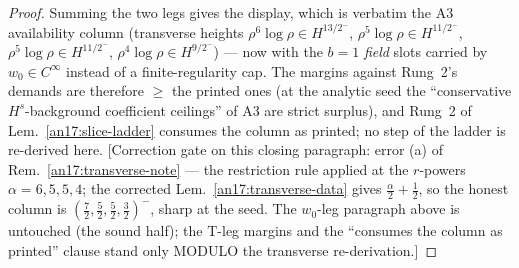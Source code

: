 \begin{proof}
Summing the two legs gives the display, which is verbatim the A3
availability column (transverse heights $\rho^6\log\rho\in
H^{13/2^-}$, $\rho^5\log\rho\in H^{11/2^-}$, $\rho^5\log\rho\in H^{11/2^-}$,
$\rho^4\log\rho\in H^{9/2^-}$) --- now with the $b{=}1$ \emph{field} slots
carried by $w_0\in C^\infty$ instead of a finite-regularity cap. The margins
against Rung~2's demands are therefore $\ge$ the printed ones (at the
analytic seed the ``conservative $H^s$-background coefficient ceilings'' of
A3 are strict surplus), and Rung~2 of Lem.\ \ref{an17:slice-ladder} consumes the
column as printed; no step of the ladder is re-derived here.
\textup{[Correction gate on this closing paragraph: error (a) of Rem.\
\ref{an17:transverse-note} --- the restriction rule applied at the $r$-powers
$\alpha=6,5,5,4$; the corrected Lem.\ \ref{an17:transverse-data} gives
$\tfrac\alpha2+\tfrac12$, so the honest column is
$(\tfrac72,\tfrac52,\tfrac52,\tfrac32)^-$, sharp at the seed. The $w_0$-leg
paragraph above is untouched (the sound half); the T-leg margins and the
``consumes the column as printed'' clause stand only MODULO the transverse
re-derivation.]}
\end{proof}

